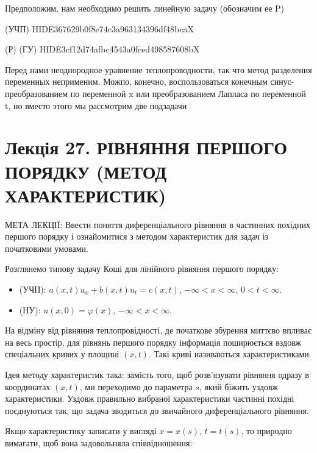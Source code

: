 \documentclass[
  ukrainian,
]{article}
\providecommand{\tightlist}{%
  \setlength{\itemsep}{0pt}\setlength{\parskip}{0pt}}
\begin{document}
Предположим, нам необходимо решить линейную задачу (обозначим ее P)

(УЧП) HIDE367629b0f8e74c3a963134396df48bcaX

(Р) (ГУ) HIDE3cf12d74afbc4543a0fced498587608bX

Перед нами неоднородное уравнение теплопроводности, так что метод
разделения переменных неприменим. Можпо, конечно, воспользоваться
конечным синус-преобразованием по переменной x или преобразованием
Лапласа по переменной t, но вместо этого мы рассмотрим две подзадачи

\section{Лекція 27. РІВНЯННЯ ПЕРШОГО ПОРЯДКУ (МЕТОД
ХАРАКТЕРИСТИК)}\label{ux43bux435ux43aux446ux456ux44f-27.-ux440ux456ux432ux43dux44fux43dux43dux44f-ux43fux435ux440ux448ux43eux433ux43e-ux43fux43eux440ux44fux434ux43aux443-ux43cux435ux442ux43eux434-ux445ux430ux440ux430ux43aux442ux435ux440ux438ux441ux442ux438ux43a}

МЕТА ЛЕКЦІЇ: Ввести поняття диференціального рівняння в частинних
похідних першого порядку і ознайомитися з методом характеристик для
задач із початковими умовами.

Розглянемо типову задачу Коші для лінійного рівняння першого порядку:

\begin{itemize}
\tightlist
\item
  (УЧП): \(a(x,t)u_x + b(x,t)u_t = c(x,t)\), \(-\infty < x < \infty\),
  \(0 < t < \infty\).
\item
  (НУ): \(u(x,0) = \varphi(x)\), \(-\infty < x < \infty\).
\end{itemize}

На відміну від рівняння теплопровідності, де початкове збурення миттєво
впливає на весь простір, для рівнянь першого порядку інформація
поширюється вздовж спеціальних кривих у площині \((x,t)\). Такі криві
називаються характеристиками.

Ідея методу характеристик така: замість того, щоб розв'язувати рівняння
одразу в координатах \((x,t)\), ми переходимо до параметра \(s\), який
біжить уздовж характеристики. Уздовж правильно вибраної характеристики
частинні похідні поєднуються так, що задача зводиться до звичайного
диференціального рівняння.

Якщо характеристику записати у вигляді \(x=x(s)\), \(t=t(s)\), то
природно вимагати, щоб вона задовольняла співвідношення:
\end{document}
